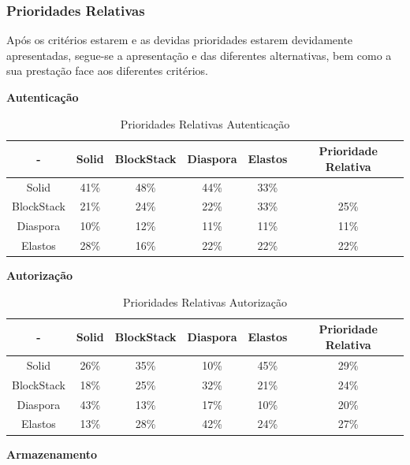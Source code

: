 \pagebreak

\subsubsection{Prioridades Relativas}
Após os critérios estarem e as devidas prioridades estarem devidamente apresentadas, segue-se a apresentação e das diferentes alternativas, bem como a sua prestação face aos diferentes critérios.

\textbf{Autenticação}

\begin{table}[h]
\centering
\caption{Prioridades Relativas Autenticação}
\vspace{0.5cm}
\begin{tabular}{c|c|c|c|c|c} 
 - & Solid & BlockStack & Diaspora & Elastos & Prioridade Relativa \\
\hline                               
Solid & 41\% &	48\% &	44\% & 33\% \\
BlockStack &  21\% & 24\% &	22\% &	33\% &	25\% \\
Diaspora &  10\% &	12\% &	11\% & 11\%	& 11\% \\
Elastos & 28\% & 16\% & 22\% & 22\% & 22\% \\
\end{tabular}
\label{tab:ex_map}
\end{table}

\textbf{Autorização}

\begin{table}[h]
\centering
\caption{Prioridades Relativas Autorização}
\vspace{0.5cm}
\begin{tabular}{c|c|c|c|c|c} 
 - & Solid & BlockStack & Diaspora & Elastos & Prioridade Relativa \\
\hline                               
Solid & 26\% &	35\% &	10\% & 45\% & 29\% \\
BlockStack &  18\% & 25\% & 32\% & 21\% & 24\% \\
Diaspora &  43\% &	13\% &	17\% &	10\% & 20\% \\
Elastos & 13\% & 28\% &	42\% & 24\% & 27\% \\
\end{tabular}
\label{tab:ex_map}
\end{table}

\pagebreak

\textbf{Armazenamento}

